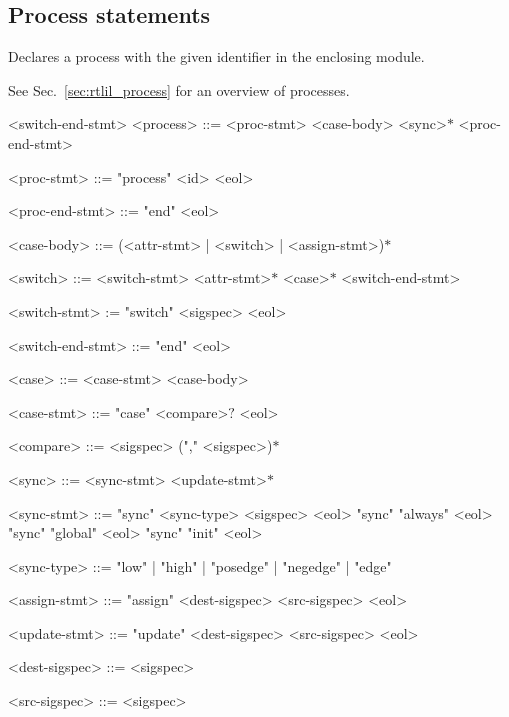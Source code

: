 \subsection{Process statements}

Declares a process with the given identifier in the enclosing module.

See Sec.~\ref{sec:rtlil_process} for an overview of processes.

\begin{indentgrammar}{<switch-end-stmt>}
<process> ::= <proc-stmt> <case-body> <sync>$*$ <proc-end-stmt>

<proc-stmt> ::= "process" <id> <eol>

<proc-end-stmt> ::= "end" <eol>

<case-body> ::= (<attr-stmt> | <switch> | <assign-stmt>)$*$

<switch> ::= <switch-stmt> <attr-stmt>$*$ <case>$*$ <switch-end-stmt>

<switch-stmt> := "switch" <sigspec> <eol>

<switch-end-stmt> ::= "end" <eol>

<case> ::= <case-stmt> <case-body>

<case-stmt> ::= "case" <compare>$?$ <eol>

<compare> ::= <sigspec> ("," <sigspec>)$*$

<sync> ::= <sync-stmt> <update-stmt>$*$

<sync-stmt> ::= 
"sync" <sync-type> <sigspec> <eol>
  \alt "sync" "always" <eol>
  \alt "sync" "global" <eol>
  \alt "sync" "init" <eol>

<sync-type> ::= "low" | "high" | "posedge" | "negedge" | "edge"

<assign-stmt> ::= "assign" <dest-sigspec> <src-sigspec> <eol>

<update-stmt> ::= "update" <dest-sigspec> <src-sigspec> <eol>

<dest-sigspec> ::= <sigspec>

<src-sigspec> ::= <sigspec>
\end{indentgrammar}

